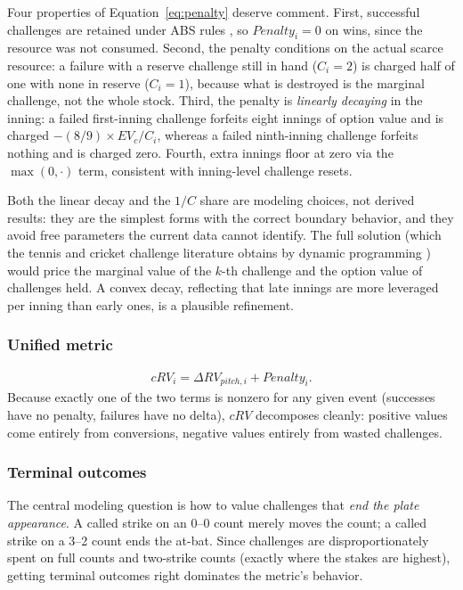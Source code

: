 Four properties of Equation~\ref{eq:penalty} deserve comment. First,
successful challenges are retained under ABS rules \citep{mlbabs2026}, so $Penalty_i = 0$ on
wins, since the resource was not consumed. Second, the penalty conditions on the
actual scarce resource: a failure with a reserve challenge still in hand
($C_i = 2$) is charged half of one with none in reserve ($C_i = 1$), because
what is destroyed is the marginal challenge, not the whole stock. Third, the
penalty is \emph{linearly decaying} in the inning: a failed first-inning
challenge forfeits eight innings of option value and is charged
$-(8/9) \times EV_c/C_i$, whereas a failed ninth-inning challenge forfeits
nothing and is charged zero. Fourth, extra innings floor at zero via the
$\max(0,\cdot)$ term, consistent with inning-level challenge resets.

Both the linear decay and the $1/C$ share are modeling choices, not derived
results: they are the simplest forms with the correct boundary behavior, and
they avoid free parameters the current data cannot identify. The full
solution (which the tennis and cricket challenge literature obtains by
dynamic programming \citep{abramitzky2012,clarkenorman2012,shivakumar2018}) would
price the marginal value of the $k$-th challenge and the option value of
challenges held. A convex decay, reflecting that late innings are more
leveraged per inning than early ones, is a plausible refinement.

\subsubsection{Unified metric}
\begin{align}
cRV_i = \Delta RV_{pitch,i} + Penalty_i.
\end{align}
Because exactly one of the two terms is nonzero for any given event
(successes have no penalty, failures have no delta), $cRV$ decomposes cleanly:
positive values come entirely from conversions, negative values entirely from
wasted challenges.

\subsubsection{Terminal outcomes}
\label{sec:terminal}
The central modeling question is how to value challenges that \emph{end the
plate appearance}. A called strike on an 0--0 count merely moves the count; a
called strike on a 3--2 count ends the at-bat. Since challenges are
disproportionately spent on full counts and two-strike counts (exactly where
the stakes are highest), getting terminal outcomes right dominates the metric's
behavior.

